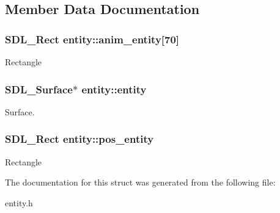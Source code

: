 \subsection{Member Data Documentation}
\subsubsection[{\texorpdfstring{anim\+\_\+entity}{anim_entity}}]{\setlength{\rightskip}{0pt plus 5cm}S\+D\+L\+\_\+\+Rect entity\+::anim\+\_\+entity\mbox{[}70\mbox{]}}\hypertarget{structentity_a854a764985b0f1ae5969d3d31534dafc}{}\label{structentity_a854a764985b0f1ae5969d3d31534dafc}
Rectangle 
\subsubsection[{\texorpdfstring{entity}{entity}}]{\setlength{\rightskip}{0pt plus 5cm}S\+D\+L\+\_\+\+Surface$\ast$ entity\+::entity}\hypertarget{structentity_a1d532bf2d860422dbcdbf5a3d53bec2a}{}\label{structentity_a1d532bf2d860422dbcdbf5a3d53bec2a}
Surface. 
\subsubsection[{\texorpdfstring{pos\+\_\+entity}{pos_entity}}]{\setlength{\rightskip}{0pt plus 5cm}S\+D\+L\+\_\+\+Rect entity\+::pos\+\_\+entity}\hypertarget{structentity_afad5429807d112e50d95031d2a7317ca}{}\label{structentity_afad5429807d112e50d95031d2a7317ca}
Rectangle 

The documentation for this struct was generated from the following file\+:\begin{DoxyCompactItemize}
\item 
entity.\+h\end{DoxyCompactItemize}
